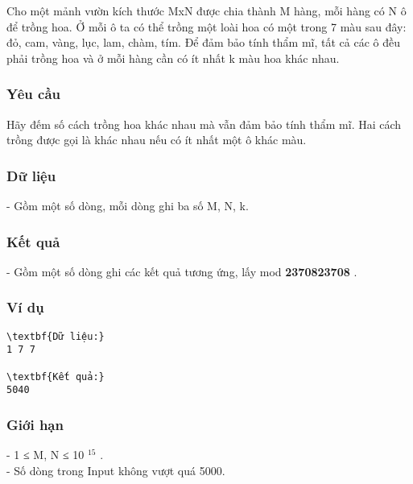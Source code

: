 







   Cho một mảnh vườn kích thước MxN được chia thành M hàng, mỗi hàng có N ô để trồng hoa. Ở mỗi ô ta có thể trồng một loài hoa có một trong 7 màu sau đây: đỏ, cam, vàng, lục, lam, chàm, tím. Để đảm bảo tính thẩm mĩ, tất cả các ô đều phải trồng hoa và ở mỗi hàng cần có ít nhất k màu hoa khác nhau.  

\subsubsection{   Yêu cầu  }

   Hãy đếm số cách trồng hoa khác nhau mà vẫn đảm bảo tính thẩm mĩ. Hai cách trồng được gọi là khác nhau nếu có ít nhất một ô khác màu.  

\subsubsection{   Dữ liệu  }

   - Gồm một số dòng, mỗi dòng ghi ba số M, N, k.  

\subsubsection{   Kết quả  }

   - Gồm một số dòng ghi các kết quả tương ứng, lấy mod   \textbf{    2370823708   }   .  

\subsubsection{   Ví dụ  }
\begin{verbatim}
\textbf{Dữ liệu:}
1 7 7

\textbf{Kết quả:}
5040
\end{verbatim}

\subsubsection{   Giới hạn  }

   - 1 ≤ M, N ≤ 10   $^    15   $   .   
\\   - Số dòng trong Input không vượt quá 5000.  


